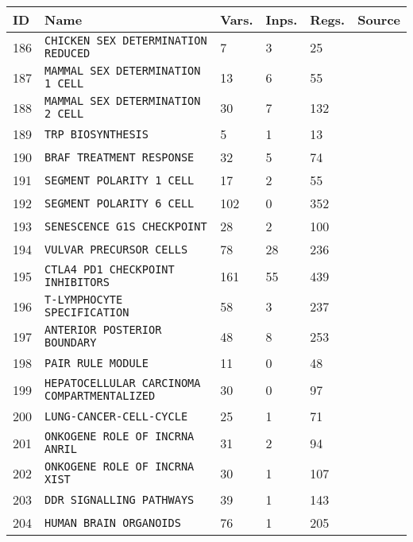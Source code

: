 \documentclass{article}
\begin{document}
\begin{center}
	\begin{tabular}{ | C{16pt} | C{149pt} | C{25pt} | C{25pt} | C{25pt} | C{36pt} | }
		\hline
		ID & Name & Vars. & Inps. & Regs. & Source \\ 	 	
		 & \texttt{CHICKEN SEX DETERMINATION REDUCED} & 7 & 3 & 25 & \cite{bbm-185-186} \\
		 & \texttt{MAMMAL SEX DETERMINATION 1 CELL} & 13 & 6 & 55 & \cite{bbm-187-188} \\
		 & \texttt{MAMMAL SEX DETERMINATION 2 CELL} & 30 & 7 & 132 & \cite{bbm-187-188} \\
		 & \texttt{TRP BIOSYNTHESIS} & 5 & 1 & 13 & \cite{bbm-189} \\
		 & \texttt{BRAF TREATMENT RESPONSE} & 32 & 5 & 74 & \cite{bbm-190} \\
		 & \texttt{SEGMENT POLARITY 1 CELL} & 17 & 2 & 55 & \cite{bbm-191-192} \\
		 & \texttt{SEGMENT POLARITY 6 CELL} & 102 & 0 & 352 & \cite{bbm-191-192} \\
		 & \texttt{SENESCENCE G1S CHECKPOINT} & 28 & 2 & 100 & \cite{bbm-193} \\
		 & \texttt{VULVAR PRECURSOR CELLS} & 78 & 28 & 236 & \cite{bbm-194} \\
		 & \texttt{CTLA4 PD1 CHECKPOINT INHIBITORS} & 161 & 55 & 439 & \cite{bbm-195} \\
		 & \texttt{T-LYMPHOCYTE SPECIFICATION} & 58 & 3 & 237 & \cite{bbm-196} \\
		 & \texttt{ANTERIOR POSTERIOR BOUNDARY} & 48 & 8 & 253 & \cite{bbm-197} \\
		 & \texttt{PAIR RULE MODULE} & 11 & 0 & 48 & \cite{bbm-198} \\
		 & \texttt{HEPATOCELLULAR CARCINOMA COMPARTMENTALIZED} & 30 & 0 & 97 & \cite{bbm-199} \\
		 & \texttt{LUNG-CANCER-CELL-CYCLE} & 25 & 1 & 71 & \cite{bbm-200} \\
		 & \texttt{ONKOGENE ROLE OF INCRNA ANRIL} & 31 & 2 & 94 & \cite{bbm-201} \\
		 & \texttt{ONKOGENE ROLE OF INCRNA XIST} & 30 & 1 & 107 & \cite{bbm-202} \\
		 & \texttt{DDR SIGNALLING PATHWAYS} & 39 & 1 & 143 & \cite{bbm-203} \\
		 & \texttt{HUMAN BRAIN ORGANOIDS} & 76 & 1 & 205 & \cite{bbm-204} \\

\end{tabular}
\end{center}
\end{document}
